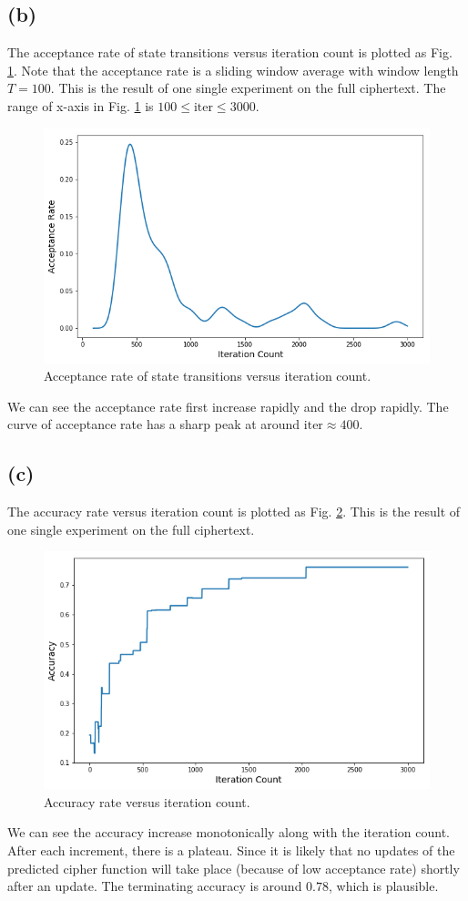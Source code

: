 \documentclass[12pt]{article}
\begin{document}
\subsection{(b)}
The acceptance rate of state transitions versus iteration count is plotted as Fig. \ref{fig:acceptance-rate}. Note that the acceptance rate is a sliding window average with window length $T=100$. This is the result of one single experiment on the full ciphertext. The range of x-axis in Fig. \ref{fig:acceptance-rate} is $100\leq\text{iter}\leq3000$.  
\begin{figure}[H]
	\centering
	\includegraphics[width=0.9\linewidth]{pics/acceptance-rate.png}
	\caption{Acceptance rate of state transitions versus iteration count.}
	\label{fig:acceptance-rate}
\end{figure}
We can see the acceptance rate first increase rapidly and the drop rapidly. The curve of acceptance rate has a sharp peak at around $\text{iter}\approx400$.

\subsection{(c)}
The accuracy rate versus iteration count is plotted as Fig. \ref{fig:accuracy}. This is the result of one single experiment on the full ciphertext. 
\begin{figure}[H]
	\centering
	\includegraphics[width=0.9\linewidth]{pics/accuracy.png}
	\caption{Accuracy rate versus iteration count.}
	\label{fig:accuracy}
\end{figure}
We can see the accuracy increase monotonically along with the iteration count. After each increment, there is a plateau. Since it is likely that no updates of the predicted cipher function will take place (because of low acceptance rate) shortly after an update. The terminating accuracy is around $0.78$, which is plausible.
\end{document}
